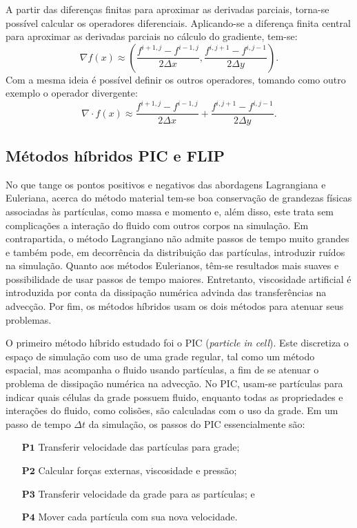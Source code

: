 \documentclass[12pt,a4paper,dvipsnames]{article}
\newcommand{\tb}[1]{\ensuremath{\textbf{#1}}}
\begin{document}
A partir das diferenças finitas para aproximar as derivadas parciais, torna-se possível calcular os operadores diferenciais. Aplicando-se a diferença finita central para aproximar as derivadas parciais no cálculo do gradiente, tem-se:
\begin{equation}
    \nabla f(x) \approx \left( \frac{f^{i+1, j} - f^{i-1,j}}{2\Delta x}, \frac{f^{i, j+1} - f^{i,j-1}}{2\Delta y} \right).
\end{equation}
Com a mesma ideia é possível definir os outros operadores, tomando como outro exemplo o operador divergente:
\begin{equation}
    \nabla \cdot f(x) \approx \frac{f^{i+1, j} - f^{i-1,j}}{2\Delta x} +  \frac{f^{i, j+1} - f^{i,j-1}}{2\Delta y}.
\end{equation}

\subsection{Métodos híbridos PIC e FLIP}
\label{ssec:hibridmethods}


No que tange os pontos positivos e negativos das abordagens Lagrangiana e Euleriana, acerca do método material tem-se boa conservação de grandezas físicas associadas às partículas, como massa e momento e, além disso, este trata sem complicações a interação do fluido com outros corpos na simulação. Em contrapartida, o método Lagrangiano não admite passos de tempo muito grandes e também pode, em decorrência da distribuição das partículas, introduzir ruídos na simulação. Quanto aos métodos Eulerianos, têm-se resultados mais suaves e possibilidade de usar passos de tempo maiores. Entretanto, viscosidade artificial é introduzida por conta da dissipação numérica advinda das transferências na advecção. Por fim, os métodos híbridos usam os dois métodos para atenuar seus problemas.

O primeiro método híbrido estudado foi o PIC (\emph{particle in cell}). Este discretiza o espaço de simulação com uso de uma grade regular, tal como um método espacial, mas acompanha o fluido usando partículas, a fim de se atenuar o problema de dissipação numérica na advecção. No PIC, usam-se partículas para indicar quais células da grade possuem fluido, enquanto todas as propriedades e interações do fluido, como colisões, são calculadas com o uso da grade. Em um passo de tempo $\Delta t$ da simulação, os passos do PIC essencialmente são:
\begin{itemize}
    \item [\tb{P1}] Transferir velocidade das partículas para grade;
    \item [\tb{P2}] Calcular forças externas, viscosidade e pressão;
    \item [\tb{P3}] Transferir velocidade da grade para as partículas; e
    \item [\tb{P4}] Mover cada partícula com sua nova velocidade.
\end{itemize}
\end{document}
